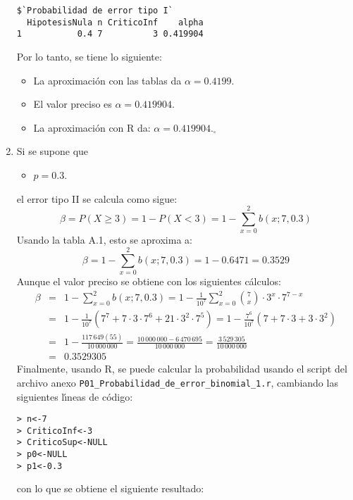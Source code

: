 \begin{solucion}
\begin{enumerate}
\begin{verbatim}
$`Probabilidad de error tipo I`
  HipotesisNula n CriticoInf    alpha
1           0.4 7          3 0.419904
  \end{verbatim}
  \vspace{-0.5cm}
  Por lo tanto, se tiene lo siguiente:
  \begin{itemize}
   \item La aproximaci\'on con las tablas da $\alpha = 0.4199$.
   \item El valor preciso es $\alpha = 0.419904$.
   \item La aproximaci\'on con R da: $\alpha = 0.419904$.${}_{\square}$
  \end{itemize}
  
  \item Si se supone que
  \begin{itemize}
   \item $p = 0.3$.
  \end{itemize}
  el error tipo II se calcula como sigue:
  \begin{equation*}
   \beta = P(X \geq 3) = 1 - P(X < 3) = 1 - \sum_{x=0}^{2} b(x;7,0.3)
  \end{equation*}
  Usando la tabla A.1, esto se aproxima a:
  \begin{equation*}
   \beta = 1 - \sum_{x=0}^{2} b(x;7,0.3) = 1 - 0.6471 = 0.3529
  \end{equation*}
  Aunque el valor preciso se obtiene con los siguientes c\'alculos:
  \begin{eqnarray*}
   \beta & = & 1 - \sum_{x=0}^{2} b(x;7,0.3) = 1 - \frac{1}{10^7}\sum_{x=0}^{2} \binom{7}{x} \cdot 3^x \cdot 7^{7-x} \\
   & = & 1 - \frac{1}{10^7}\left(7^7 + 7\cdot 3 \cdot 7^6 + 21 \cdot 3^2 \cdot 7^5\right) = 1 - \frac{7^6}{10^7}(7 + 7\cdot 3 + 3\cdot 3^2) \\
   & = & 1 - \frac{117\,649(55)}{10\,000\,000} = \frac{10\,000\,000 - 6\,470\,695}{10\,000\,000} = \frac{3\,529\,305}{10\,000\,000} \\
   & = & 0.3529305
  \end{eqnarray*}
  Finalmente, usando R, se puede calcular la probabilidad usando el script del archivo anexo \texttt{P01\_Probabilidad\_de\_error\_binomial\_1.r}, cambiando las siguientes l\'{\i}neas de c\'odigo:
  \begin{verbatim}
> n<-7
> CriticoInf<-3
> CriticoSup<-NULL
> p0<-NULL
> p1<-0.3
  \end{verbatim}
  \vspace{-0.5cm}
  con lo que se obtiene el siguiente resultado:

\end{enumerate}
\end{solucion}
